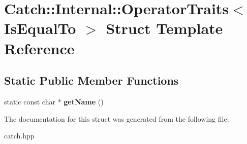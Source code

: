 \hypertarget{structCatch_1_1Internal_1_1OperatorTraits_3_01IsEqualTo_01_4}{}\section{Catch\+:\+:Internal\+:\+:Operator\+Traits$<$ Is\+Equal\+To $>$ Struct Template Reference}
\label{structCatch_1_1Internal_1_1OperatorTraits_3_01IsEqualTo_01_4}
\subsection*{Static Public Member Functions}
\begin{DoxyCompactItemize}
\item 
\mbox{\label{structCatch_1_1Internal_1_1OperatorTraits_3_01IsEqualTo_01_4_addf03ac66f0ed83abcc037a7a327d4f1}} 
static const char $\ast$ {\bfseries get\+Name} ()
\end{DoxyCompactItemize}


The documentation for this struct was generated from the following file\+:\begin{DoxyCompactItemize}
\item 
catch.\+hpp\end{DoxyCompactItemize}
